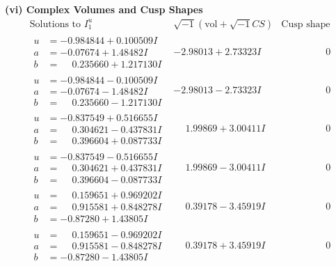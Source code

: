 \documentclass[1p]{elsarticle_modified}
\theoremstyle{definition}
\newcommand{\I}{\sqrt{-1}}
\begin{document}
\newpage\flushleft \textbf{(vi) Complex Volumes and Cusp Shapes}
$$\begin{array}{c|c|c}  
\text{Solutions to }I^u_{1}& \I (\text{vol} + \sqrt{-1}CS) & \text{Cusp shape}\\
 \hline 
\begin{aligned}
u &= -0.984844 + 0.100509 I \\
a &= -0.07674 + 1.48482 I \\
b &= \phantom{-}0.235660 + 1.217130 I\end{aligned}
 & -2.98013 + 2.73323 I & \phantom{-0.000000 } 0 \\ \hline\begin{aligned}
u &= -0.984844 - 0.100509 I \\
a &= -0.07674 - 1.48482 I \\
b &= \phantom{-}0.235660 - 1.217130 I\end{aligned}
 & -2.98013 - 2.73323 I & \phantom{-0.000000 } 0 \\ \hline\begin{aligned}
u &= -0.837549 + 0.516655 I \\
a &= \phantom{-}0.304621 - 0.437831 I \\
b &= \phantom{-}0.396604 + 0.087733 I\end{aligned}
 & \phantom{-}1.99869 + 3.00411 I & \phantom{-0.000000 } 0 \\ \hline\begin{aligned}
u &= -0.837549 - 0.516655 I \\
a &= \phantom{-}0.304621 + 0.437831 I \\
b &= \phantom{-}0.396604 - 0.087733 I\end{aligned}
 & \phantom{-}1.99869 - 3.00411 I & \phantom{-0.000000 } 0 \\ \hline\begin{aligned}
u &= \phantom{-}0.159651 + 0.969202 I \\
a &= \phantom{-}0.915581 + 0.848278 I \\
b &= -0.87280 + 1.43805 I\end{aligned}
 & \phantom{-}0.39178 - 3.45919 I & \phantom{-0.000000 } 0 \\ \hline\begin{aligned}
u &= \phantom{-}0.159651 - 0.969202 I \\
a &= \phantom{-}0.915581 - 0.848278 I \\
b &= -0.87280 - 1.43805 I\end{aligned}
 & \phantom{-}0.39178 + 3.45919 I & \phantom{-0.000000 } 0 \\ \hline\begin{aligned}

\end{aligned}
\end{array}$$
\end{document}
